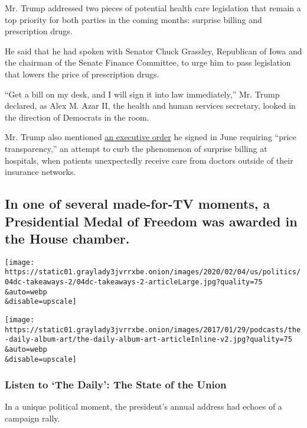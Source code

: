 Mr. Trump addressed two pieces of potential health care legislation that
remain a top priority for both parties in the coming months: surprise
billing and prescription drugs.

He said that he had spoken with Senator Chuck Grassley, Republican of
Iowa and the chairman of the Senate Finance Committee, to urge him to
pass legislation that lowers the price of prescription drugs.

``Get a bill on my desk, and I will sign it into law immediately,'' Mr.
Trump declared, as Alex M. Azar II, the health and human services
secretary, looked in the direction of Democrats in the room.

Mr. Trump also mentioned
\href{https://www.whitehouse.gov/presidential-actions/executive-order-improving-price-quality-transparency-american-healthcare-put-patients-first/}{an
executive order} he signed in June requiring ``price transparency,'' an
attempt to curb the phenomenon of surprise billing at hospitals, when
patients unexpectedly receive care from doctors outside of their
insurance networks.

\hypertarget{in-one-of-several-made-for-tv-moments-a-presidential-medal-of-freedom-was-awarded-in-the-house-chamber}{%
\subsection{In one of several made-for-TV moments, a Presidential Medal
of Freedom was awarded in the House
chamber.}\label{in-one-of-several-made-for-tv-moments-a-presidential-medal-of-freedom-was-awarded-in-the-house-chamber}}

\texttt{[image: https://static01.graylady3jvrrxbe.onion/images/2020/02/04/us/politics/04dc-takeaways-2/04dc-takeaways-2-articleLarge.jpg?quality=75\\\&auto=webp\\\&disable=upscale]}

\texttt{[image: https://static01.graylady3jvrrxbe.onion/images/2017/01/29/podcasts/the-daily-album-art/the-daily-album-art-articleInline-v2.jpg?quality=75\\\&auto=webp\\\&disable=upscale]}

\hypertarget{listen-to-the-daily-the-state-of-the-union}{%
\subsubsection{Listen to `The Daily': The State of the
Union}\label{listen-to-the-daily-the-state-of-the-union}}

In a unique political moment, the president's annual address had echoes
of a campaign rally.

